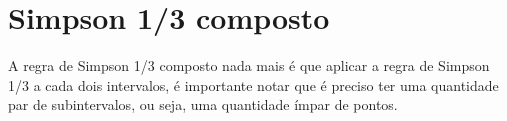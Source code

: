 \chapter{Simpson 1/3 composto}
A regra de Simpson 1/3 composto nada mais é que aplicar a regra de Simpson 1/3 a
cada dois intervalos, é importante notar que é preciso ter uma quantidade par de
subintervalos, ou seja, uma quantidade ímpar de pontos.
